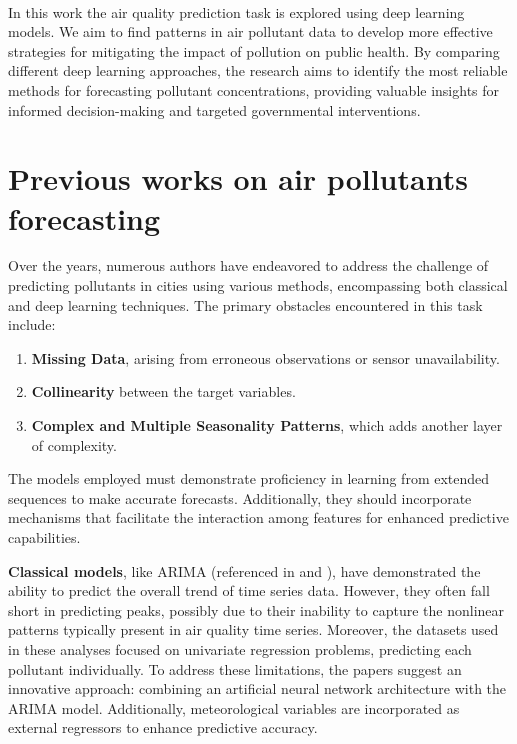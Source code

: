 \paragraph{}

In this work the air quality prediction task is explored using deep learning models. We aim to find patterns in air pollutant data to develop more effective strategies for mitigating the impact of pollution on public health. By comparing different deep learning approaches, the research aims to identify the most reliable methods for forecasting pollutant concentrations, providing valuable insights for informed decision-making and targeted governmental interventions.

\section{Previous works on air pollutants forecasting}
\label{cap1:sota}
Over the years, numerous authors have endeavored to address the challenge of predicting pollutants in cities using various methods, encompassing both classical and deep learning techniques. The primary obstacles encountered in this task include:

\begin{enumerate}
  \item \textbf{Missing Data}, arising from erroneous observations or sensor unavailability.
  \item \textbf{Collinearity} between the target variables.
  \item \textbf{Complex and Multiple Seasonality Patterns}, which adds another layer of complexity.
\end{enumerate}

The models employed must demonstrate proficiency in learning from extended sequences to make accurate forecasts. Additionally, they should incorporate mechanisms that facilitate the interaction among features for enhanced predictive capabilities.

\textbf{Classical models}, like ARIMA (referenced in \cite{DIAZROBLES20088331} and \cite{Jodar2013}), have demonstrated the ability to predict the overall trend of time series data. However, they often fall short in predicting peaks, possibly due to their inability to capture the nonlinear patterns typically present in air quality time series. Moreover, the datasets used in these analyses focused on univariate regression problems, predicting each pollutant individually. To address these limitations, the papers suggest an innovative approach: combining an artificial neural network architecture with the ARIMA model. Additionally, meteorological variables are incorporated as external regressors to enhance predictive accuracy.\\

